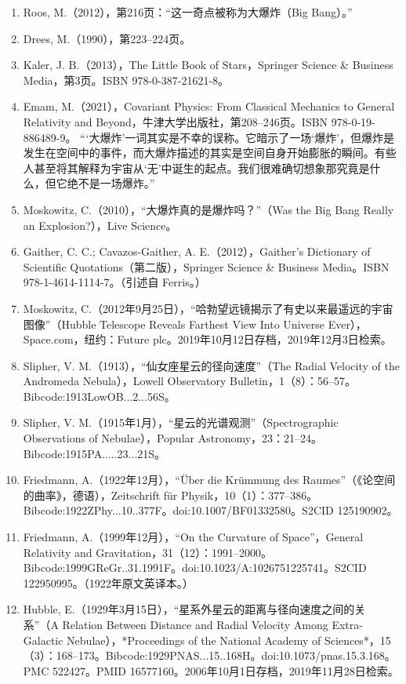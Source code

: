 \begin{enumerate}
\item Roos, M.（2012），第216页：“这一奇点被称为大爆炸（Big Bang）。”  
\item Drees, M.（1990），第223–224页。  
\item Kaler, J. B.（2013），The Little Book of Stars，Springer Science & Business Media，第3页。ISBN 978-0-387-21621-8。  
\item Emam, M.（2021），Covariant Physics: From Classical Mechanics to General Relativity and Beyond，牛津大学出版社，第208–246页。ISBN 978-0-19-886489-9。  
  “‘大爆炸’一词其实是不幸的误称。它暗示了一场‘爆炸’，但爆炸是发生在空间中的事件，而大爆炸描述的其实是空间自身开始膨胀的瞬间。有些人甚至将其解释为宇宙从‘无’中诞生的起点。我们很难确切想象那究竟是什么，但它绝不是一场爆炸。”  
\item Moskowitz, C.（2010），“大爆炸真的是爆炸吗？”（Was the Big Bang Really an Explosion?），Live Science。  
\item Gaither, C. C.; Cavazos-Gaither, A. E.（2012），Gaither's Dictionary of Scientific Quotations（第二版），Springer Science & Business Media。ISBN 978-1-4614-1114-7。（引述自 Ferris。）  
\item Moskowitz, C.（2012年9月25日），“哈勃望远镜揭示了有史以来最遥远的宇宙图像”（Hubble Telescope Reveals Farthest View Into Universe Ever），Space.com，纽约：Future plc。2019年10月12日存档，2019年12月3日检索。  
\item Slipher, V. M.（1913），“仙女座星云的径向速度”（The Radial Velocity of the Andromeda Nebula），Lowell Observatory Bulletin，1（8）：56–57。Bibcode:1913LowOB...2...56S。  
\item Slipher, V. M.（1915年1月），“星云的光谱观测”（Spectrographic Observations of Nebulae），Popular Astronomy，23：21–24。Bibcode:1915PA.....23...21S。  
\item Friedmann, A.（1922年12月），“Über die Krümmung des Raumes”（《论空间的曲率》，德语），Zeitschrift für Physik，10（1）：377–386。Bibcode:1922ZPhy...10..377F。doi:10.1007/BF01332580。S2CID 125190902。  
\item Friedmann, A.（1999年12月），“On the Curvature of Space”，General Relativity and Gravitation，31（12）：1991–2000。Bibcode:1999GReGr..31.1991F。doi:10.1023/A:1026751225741。S2CID 122950995。（1922年原文英译本。）  
\item Hubble, E.（1929年3月15日），“星系外星云的距离与径向速度之间的关系”（A Relation Between Distance and Radial Velocity Among Extra-Galactic Nebulae），*Proceedings of the National Academy of Sciences*，15（3）：168–173。Bibcode:1929PNAS...15..168H。doi:10.1073/pnas.15.3.168。PMC 522427。PMID 16577160。2006年10月1日存档，2019年11月28日检索。  

\end{enumerate}

